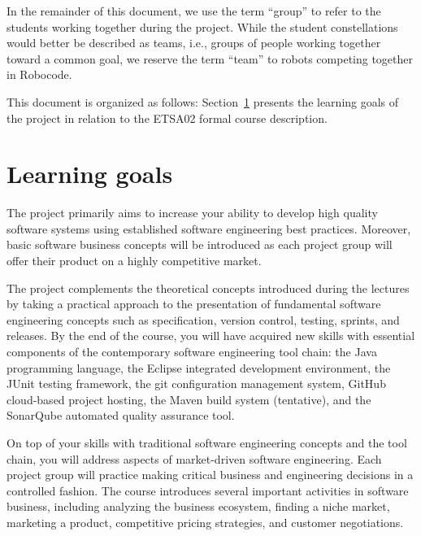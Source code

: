 \documentclass{scrreprt}
\begin{document}
In the remainder of this document, we use the term ``group'' to refer to the students working together during the project. While the student constellations would better be described as teams, i.e., groups of people working together toward a common goal, we reserve the term ``team'' to robots competing together in Robocode.

This document is organized as follows: Section~\ref{sec:goals} presents the learning goals of the project in relation to the ETSA02 formal course description.

\section{Learning goals} \label{sec:goals}
The project primarily aims to increase your ability to develop high quality software systems using established software engineering best practices. Moreover, basic software business concepts will be introduced as each project group will offer their product on a highly competitive market.

The project complements the theoretical concepts introduced during the lectures by taking a practical approach to the presentation of fundamental software engineering concepts such as specification, version control, testing, sprints, and releases. By the end of the course, you will have acquired new skills with essential components of the contemporary software engineering tool chain: the Java programming language, the Eclipse integrated development environment, the JUnit testing framework, the git configuration management system, GitHub cloud-based project hosting, the Maven build system (tentative), and the SonarQube automated quality assurance tool.

On top of your skills with traditional software engineering concepts and the tool chain, you will address aspects of market-driven software engineering. Each project group will practice making critical business and engineering decisions in a controlled fashion. The course introduces several important activities in software business, including analyzing the business ecosystem, finding a niche market, marketing a product, competitive pricing strategies, and customer negotiations.
\end{document}
